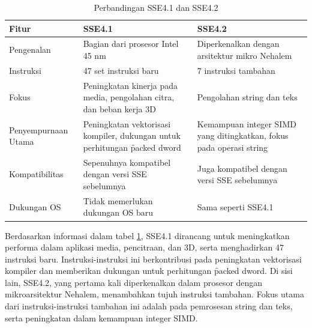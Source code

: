 \begin{table}[h]
	\centering
	\begin{tabular}{|p{3cm}|p{4.6cm}|p{4.6cm}|}
		\hline
		\textbf{Fitur}      & \textbf{SSE4.1}                                                               & \textbf{SSE4.2}                                                     \\ \hline
		Pengenalan          & Bagian dari prosesor Intel 45 nm                                              & Diperkenalkan dengan arsitektur mikro Nehalem                       \\ \hline
		Instruksi           & 47 set instruksi baru                                                         & 7 instruksi tambahan                                                \\ \hline
		Fokus               & Peningkatan kinerja pada media, pengolahan citra, dan beban kerja 3D          & Pengolahan string dan teks                                          \\ \hline
		Penyempurnaan Utama & Peningkatan vektorisasi kompiler, dukungan untuk perhitungan \f{packed dword} & Kemampuan integer SIMD yang ditingkatkan, fokus pada operasi string \\ \hline
		Kompatibilitas      & Sepenuhnya kompatibel dengan versi SSE sebelumnya                             & Juga kompatibel dengan versi SSE sebelumnya                         \\ \hline
		Dukungan OS         & Tidak memerlukan dukungan OS baru                                             & Sama seperti SSE4.1                                                 \\ \hline
	\end{tabular}
	\caption{Perbandingan SSE4.1 dan SSE4.2}
	\label{table:perbandingan_sse4}
\end{table}

Berdasarkan informasi dalam tabel \ref{table:perbandingan_sse4}, SSE4.1 dirancang untuk meningkatkan performa dalam aplikasi media, pencitraan, dan 3D, serta menghadirkan 47 instruksi baru. Instruksi-instruksi ini berkontribusi pada peningkatan vektorisasi kompiler dan memberikan dukungan untuk perhitungan \f{packed dword}. Di sisi lain, SSE4.2, yang pertama kali diperkenalkan dalam prosesor dengan mikroarsitektur Nehalem, menambahkan tujuh instruksi tambahan. Fokus utama dari instruksi-instruksi tambahan ini adalah pada pemrosesan string dan teks, serta peningkatan dalam kemampuan integer SIMD\cite{sse4reference}.

